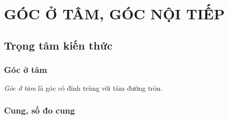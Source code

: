\setcounter{section}{2}
\section{GÓC Ở TÂM, GÓC NỘI TIẾP}
\subsection{Trọng tâm kiến thức}
\begin{tomtat}
\subsubsection{Góc ở tâm}
\begin{boxdn}
	\textit{Góc ở tâm} là góc có đỉnh trùng với tâm đường tròn.
\end{boxdn}
\subsubsection{Cung, số đo cung}

\end{tomtat}
